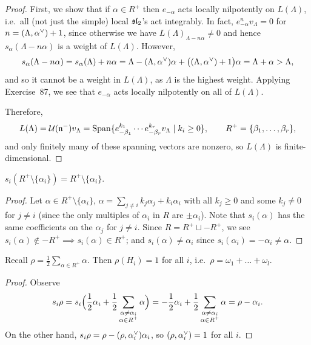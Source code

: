\begin{proof}
First, we show that if $\alpha \in R^+$ then $e_{-\alpha}$ acts locally
nilpotently on $L(\Lambda)$, i.e.\ all (not just the simple) local
$\sl_2$'s act integrably. In fact, $e_{-\alpha}^nv_\Lambda = 0$ for
$n = (\Lambda, \alpha\cv) + 1$, since otherwise we have
$L(\Lambda)_{\Lambda - n\alpha} \neq 0$ and hence $s_\alpha(\Lambda - n\alpha)$
is a weight of $L(\Lambda)$. However,
\[
  s_\alpha(\Lambda - n\alpha) = s_\alpha(\Lambda) + n\alpha
    = \Lambda - (\Lambda, \alpha\cv)\alpha + \bigl((\Lambda, \alpha\cv) + 1\bigr)\alpha
    = \Lambda + \alpha > \Lambda,
\]
and so it cannot be a weight in $L(\Lambda)$, as $\Lambda$ is the highest
weight. Applying Exercise~87, we see that $e_{-\alpha}$ acts locally
nilpotently on all of $L(\Lambda)$.

Therefore,
\[
  L(\Lambda) = \U(\fn^-)v_\Lambda
    = \Span\setc{e_{-\beta_1}^{k_1}\cdots e_{-\beta_r}^{k_r}v_\Lambda}{k_i \geq 0},
    \qquad R^+ = \{\beta_1, \dots, \beta_r\},
\]
and only finitely many of these spanning vectors are nonzero, so $L(\Lambda)$
is finite-dimensional.
\end{proof}

\begin{lemma}
$s_i(R^+ \setminus \{\alpha_i\}) = R^+ \setminus \{\alpha_i\}$.
\end{lemma}

\begin{proof}
Let $\alpha \in R^+ \setminus \{\alpha_i\}$,
$\alpha = \sum_{j \neq i} k_j\alpha_j + k_i\alpha_i$ with all $k_j \geq 0$ and
some $k_j \neq 0$ for $j \neq i$ (since the only multiples of $\alpha_i$ in $R$
are $\pm\alpha_i$). Note that $s_i(\alpha)$ has the same coefficients on the
$\alpha_j$ for $j \neq i$. Since $R = R^+ \sqcup -R^+$, we see
$s_i(\alpha) \notin -R^+ \implies s_i(\alpha) \in R^+$; and
$s_i(\alpha) \neq \alpha_i$ since $s_i(\alpha_i) = -\alpha_i \neq \alpha$.
\end{proof}

\begin{lemma}
Recall $\rho = \frac12 \sum_{\alpha \in R^+} \alpha$. Then $\rho(H_i) = 1$ for
all $i$, i.e.\ $\rho = \omega_1 + \dots + \omega_l$.
\end{lemma}

\begin{proof}
Observe
\[
  s_i\rho = s_i\Bigl(\frac12\alpha_i + \frac12\sum_{\substack{\alpha \neq \alpha_i\\ \alpha \in R^+}} \alpha\Bigr)
    = -\frac12\alpha_i + \frac12\sum_{\substack{\alpha \neq \alpha_i\\ \alpha \in R^+}} \alpha
    = \rho - \alpha_i.
\]
On the other hand, $s_i\rho = \rho - (\rho, \alpha_i\cv)\alpha_i$, so
$(\rho, \alpha_i\cv) = 1$ for all $i$.
\end{proof}

